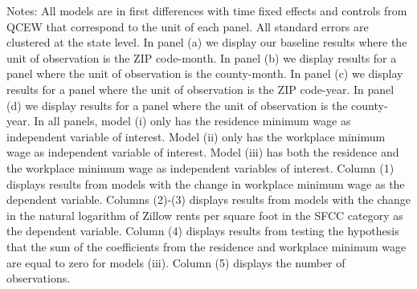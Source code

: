 \begin{table}
    \begin{minipage}{.95\textwidth} \footnotesize
        \vspace{2mm}
        Notes: All models are in first differences with time fixed effects and controls from QCEW that 
        correspond to the unit of each panel. All standard errors are clustered at the state level.
        In panel (a) we display our baseline results where the unit of observation is the ZIP code-month.
        In panel (b) we display results for a panel where the unit of observation is the county-month.
        In panel (c) we display results for a panel where the unit of observation is the ZIP code-year.
        In panel (d) we display results for a panel where the unit of observation is the county-year.
        In all panels, model (i) only has the residence minimum wage as independent variable of interest. 
        Model (ii) only has the workplace minimum wage as independent variable of interest.
        Model (iii) has both the residence and the workplace minimum wage as independent variables of interest.
        Column (1) displays results from models with the change in workplace minimum wage as the 
        dependent variable.
        Columns (2)-(3) displays results from models with the change in the natural logarithm of Zillow rents 
        per square foot in the SFCC category as the dependent variable. Column (4) displays results from
        testing the hypothesis that the sum of the coefficients from the residence and workplace minimum wage 
        are equal to zero for models (iii). Column (5) displays the number of observations. 

        
        
    \end{minipage}
\end{table}
